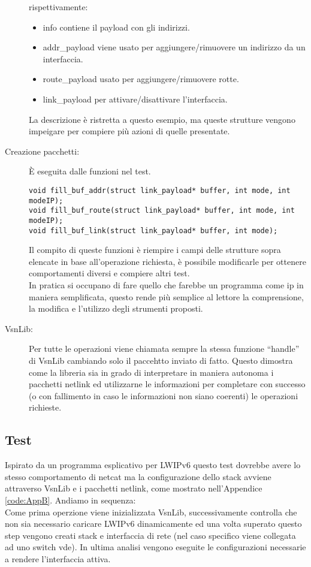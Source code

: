\begin{description}
\begin{lstlisting}[style=CStyle]
\end{lstlisting}
rispettivamente:
\begin{itemize}
  \item info contiene il payload con gli indirizzi.
  \item addr\_payload viene usato per aggiungere/rimuovere un indirizzo da un interfaccia.
  \item route\_payload usato per aggiungere/rimuovere rotte.
  \item link\_payload per attivare/disattivare l'interfaccia.
\end{itemize}
La descrizione \`e ristretta a questo esempio, ma queste strutture vengono impeigare per compiere pi\`u azioni di quelle presentate.
\item[Creazione pacchetti: ]\`E eseguita dalle funzioni nel test.
\begin{lstlisting}[style=CStyle]
void fill_buf_addr(struct link_payload* buffer, int mode, int modeIP);
void fill_buf_route(struct link_payload* buffer, int mode, int modeIP);
void fill_buf_link(struct link_payload* buffer, int mode);
\end{lstlisting}
Il compito di queste funzioni \`e riempire i campi delle strutture sopra elencate in base all'operazione richiesta, \`e possibile modificarle per ottenere comportamenti diversi e compiere altri test.\\
In pratica si occupano di fare quello che farebbe un programma come ip in maniera semplificata, questo rende pi\`u semplice al lettore la comprensione, la modifica e l'utilizzo degli strumenti proposti.
\item[VsnLib: ]Per tutte le operazioni viene chiamata sempre la stessa funzione ``handle'' di VsnLib cambiando solo il paccehtto inviato di fatto. Questo dimostra come la libreria sia in grado di interpretare in maniera autonoma i pacchetti netlink ed utilizzarne le informazioni per completare con successo (o con fallimento in caso le informazioni non siano coerenti) le operazioni richieste.
\end{description}
\subsection{Test}
Ispirato da un programma esplicativo per LWIPv6 questo test dovrebbe avere lo stesso comportamento di netcat ma la configurazione dello stack avviene attraverso VsnLib e i pacchetti netlink, come mostrato nell'Appendice \ref{code:AppB}.
Andiamo in sequenza:\\
Come prima operzione viene inizializzata VsnLib, successivamente controlla che non sia necessario caricare LWIPv6 dinamicamente ed una volta superato questo step vengono creati stack e interfaccia di rete (nel caso specifico viene collegata ad uno switch vde). In ultima analisi vengono eseguite le configurazioni necessarie a rendere l'interfaccia attiva.
